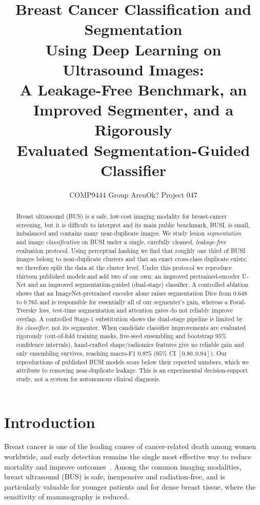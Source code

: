 \documentclass[11pt]{article}
\title{Breast Cancer Classification and Segmentation\\
Using Deep Learning on Ultrasound Images:\\
A Leakage-Free Benchmark, an Improved Segmenter, and a Rigorously\\
Evaluated Segmentation-Guided Classifier}
\author{COMP9444 Group AreuOk? Project 047}
\date{}
\begin{document}
\maketitle

\begin{abstract}
\noindent
Breast ultrasound (BUS) is a safe, low-cost imaging modality for breast-cancer
screening, but it is difficult to interpret and its main public benchmark,
BUSI, is small, imbalanced and contains many near-duplicate images. We study
lesion \emph{segmentation} and image \emph{classification} on BUSI under a
single, carefully cleaned, \emph{leakage-free} evaluation protocol. Using
perceptual hashing we find that roughly one third of BUSI images belong to
near-duplicate clusters and that an exact cross-class duplicate exists; we
therefore split the data at the cluster level. Under this protocol we reproduce
thirteen published models and add two of our own: an improved pretrained-encoder
U-Net and an improved segmentation-guided (dual-stage) classifier. A controlled
ablation shows that an ImageNet-pretrained encoder alone raises segmentation Dice
from $0.648$ to $0.765$ and is responsible for essentially all of our
segmenter's gain, whereas a Focal-Tversky loss, test-time augmentation and
attention gates do not reliably improve overlap. A controlled Stage-1
substitution shows the dual-stage pipeline is limited by its \emph{classifier},
not its segmenter. When candidate classifier improvements are evaluated
rigorously (out-of-fold training masks, five-seed ensembling and bootstrap
$95\%$ confidence intervals), hand-crafted shape/radiomics features give no
reliable gain and only ensembling survives, reaching macro-F1 $0.875$
($95\%$ CI $[0.80,0.94]$). Our reproductions of published BUSI models score
below their reported numbers, which we attribute to removing near-duplicate
leakage. This is an experimental decision-support study, not a system for
autonomous clinical diagnosis.
\end{abstract}

\section{Introduction}
\label{sec:intro}
Breast cancer is one of the leading causes of cancer-related death among women
worldwide, and early detection remains the single most effective way to reduce
mortality and improve outcomes~\cite{cheng2010survey,xian2018survey}. Among the
common imaging modalities, breast ultrasound (BUS) is safe, inexpensive and
radiation-free, and is particularly valuable for younger patients and for dense
breast tissue, where the sensitivity of mammography is reduced.
\end{document}
